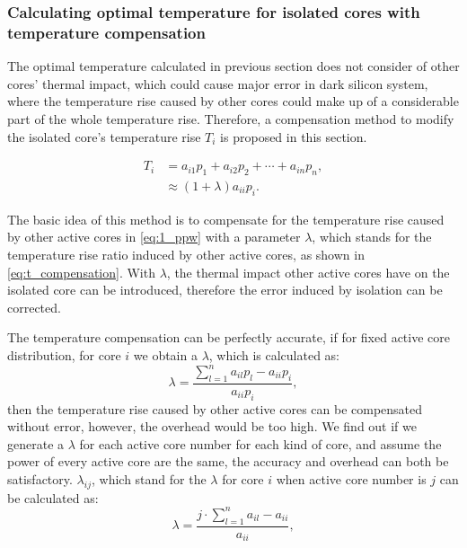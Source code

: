 \subsubsection{Calculating optimal temperature for isolated cores with temperature compensation}
The optimal temperature calculated in previous section does not consider of other cores' thermal impact, which could cause major error in dark silicon system, where the temperature rise caused by other cores could make up of a considerable part of the whole temperature rise. Therefore, a compensation method to modify the isolated core's temperature rise $T_{i}$ is proposed in this section.

\begin{equation}\label{eq:t_compensation}
\begin{split}
T_{i} &=a_{i1}p_{1} + a_{i2}p_{2} +\cdots + a_{in}p_{n},\\
&\approx(1+\lambda)a_{ii}p_{i}.
\end{split}
\end{equation}

The basic idea of this method is to compensate for the temperature rise caused by other active cores in \eqref{eq:1_ppw} with a parameter $\lambda$, which stands for the temperature rise ratio induced by other active cores, as shown in \eqref{eq:t_compensation}. With $\lambda$, the thermal impact other active cores have on the isolated core can be introduced, therefore the error induced by isolation can be corrected.

The temperature compensation can be perfectly accurate, if for fixed active core distribution, for core $i$ we obtain a $\lambda$, which is calculated as:
\begin{equation}\label{eq:lambda_accuracy}
\lambda =\frac{\sum_{l=1}^{n}a_{il}p_{l}-a_{ii}p_{i}}{a_{ii}p_{i}},
\end{equation}
then the temperature rise caused by other active cores can be compensated without error, however, the overhead would be too high. We find out if we generate a $\lambda$ for each active core number for each kind of core, and assume the power of every active core are the same, the accuracy and overhead can both be satisfactory. $\lambda_{ij}$, which stand for the $\lambda$ for core $i$ when active core number is $j$ can be calculated as:
\begin{equation}\label{eq:lambda}
\lambda =\frac{j \cdot \sum_{l=1}^{n}a_{il}-a_{ii}}{a_{ii}},
\end{equation}


